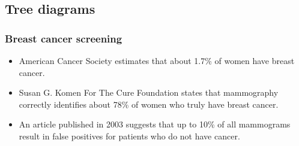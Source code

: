 
\subsection{Tree diagrams}


\begin{frame}
\frametitle{Breast cancer screening}

\begin{itemize}

\item American Cancer Society estimates that about 1.7\% of women have breast cancer. \\
{\small{}}

\item Susan G. Komen For The Cure Foundation states that mammography correctly identifies about 78\% of women who truly have breast cancer. \\
{\small{}}

\item An article published in 2003 suggests that up to 10\% of all mammograms result in false positives for patients who do not have cancer. \\{\small {}}

\end{itemize}

\vfill


\end{frame}


